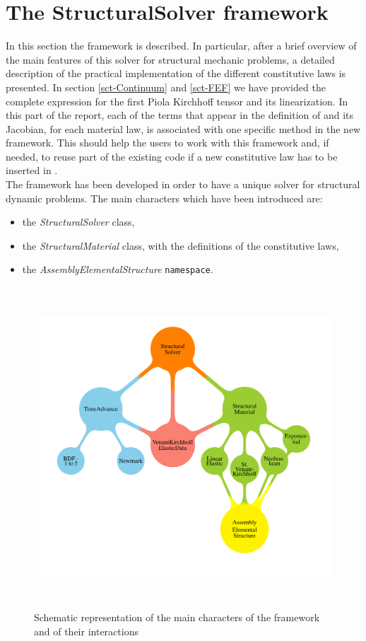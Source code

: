 \section{The StructuralSolver framework} In this section the \SSol
framework is described. In particular, after a brief overview of the
main features of this solver for structural mechanic problems, a
detailed description of the practical implementation of the different
constitutive laws is presented. In section \ref{sct-Continuum} and
\ref{sct-FEF} we have provided the complete expression for the first
Piola Kirchhoff tensor and its linearization. In this part of the
report, each of the terms that appear in the definition of \Piola and
its Jacobian, for each material law, is associated with one specific
method in the new \SSolNC framework. This should help the users to
work with this framework and, if needed, to reuse part of the existing
code if a new constitutive law has to be inserted in \LV.\\ The
\SSolNC framework has been developed in order to have a unique solver
for structural dynamic problems. The main characters which have been
introduced are:
\begin{itemize}
  \item the \textit{StructuralSolver} class,
  \item the \textit{StructuralMaterial} class, with the definitions of
the constitutive laws,
  \item the \textit{AssemblyElementalStructure} \texttt{namespace}.
\end{itemize}

\begin{figure}[h!]  \centering
  \includegraphics[width=14cm,height=12cm]{images/DesignStructural.pdf}
  \caption{Schematic representation of the main characters of the
\SSol framework and of their interactions}
  \label{fig::design}
\end{figure}
